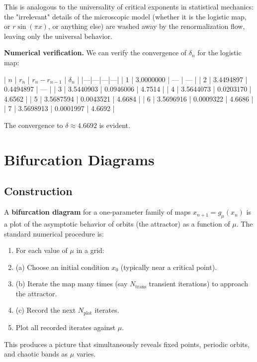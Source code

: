 \begin{definition}
This is analogous to the universality of critical exponents in statistical mechanics: the "irrelevant" details of the microscopic model (whether it is the logistic map, or $r\sin(\pi x)$, or anything else) are washed away by the renormalization flow, leaving only the universal behavior.

\textbf{Numerical verification.} We can verify the convergence of $\delta_n$ for the logistic map:

| $n$ | $r_n$ | $r_n - r_{n-1}$ | $\delta_n$ |
|---|---|---|---|
| 1 | 3.0000000 | --- | --- |
| 2 | 3.4494897 | 0.4494897 | --- |
| 3 | 3.5440903 | 0.0946006 | 4.7514 |
| 4 | 3.5644073 | 0.0203170 | 4.6562 |
| 5 | 3.5687594 | 0.0043521 | 4.6684 |
| 6 | 3.5696916 | 0.0009322 | 4.6686 |
| 7 | 3.5698913 | 0.0001997 | 4.6692 |

The convergence to $\delta \approx 4.6692$ is evident.


\bigskip

\end{definition}


\section{Bifurcation Diagrams}\label{sec:5.6}

\subsection{Construction}\label{sec:5.6.1}

A \textbf{bifurcation diagram} for a one-parameter family of maps $x_{n+1} = g_\mu(x_n)$ is a plot of the asymptotic behavior of orbits (the attractor) as a function of $\mu$. The standard numerical procedure is:

\begin{enumerate}[nosep]
  \item For each value of $\mu$ in a grid:
  \item (a) Choose an initial condition $x_0$ (typically near a critical point).
  \item (b) Iterate the map many times (say $N_{\text{trans}}$ transient iterations) to approach the attractor.
  \item (c) Record the next $N_{\text{plot}}$ iterates.
  \item Plot all recorded iterates against $\mu$.
\end{enumerate}

This produces a picture that simultaneously reveals fixed points, periodic orbits, and chaotic bands as $\mu$ varies.

